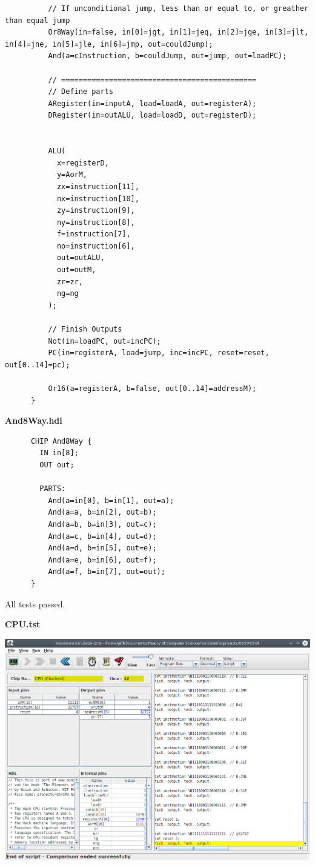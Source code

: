 \documentclass[titlepage]{article}
\begin{document}
\begin{description}
{\begin{lstlisting}
          // If unconditional jump, less than or equal to, or greather than equal jump
          Or8Way(in=false, in[0]=jgt, in[1]=jeq, in[2]=jge, in[3]=jlt, in[4]=jne, in[5]=jle, in[6]=jmp, out=couldJump);
          And(a=cInstruction, b=couldJump, out=jump, out=loadPC);

          // =============================================
          // Define parts
          ARegister(in=inputA, load=loadA, out=registerA);
          DRegister(in=outALU, load=loadD, out=registerD);


          ALU(
            x=registerD,
            y=AorM,
            zx=instruction[11],
            nx=instruction[10],
            zy=instruction[9],
            ny=instruction[8],
            f=instruction[7],
            no=instruction[6],
            out=outALU,
            out=outM,
            zr=zr,
            ng=ng
          );

          // Finish Outputs
          Not(in=loadPC, out=incPC);
          PC(in=registerA, load=jump, inc=incPC, reset=reset, out[0..14]=pc);

          Or16(a=registerA, b=false, out[0..14]=addressM);
      }
    \end{lstlisting}

    \textbf{And8Way.hdl}

    \begin{lstlisting}
      CHIP And8Way {
        IN in[8];
        OUT out;

        PARTS:
          And(a=in[0], b=in[1], out=a);
          And(a=a, b=in[2], out=b);
          And(a=b, b=in[3], out=c);
          And(a=c, b=in[4], out=d);
          And(a=d, b=in[5], out=e);
          And(a=e, b=in[6], out=f);
          And(a=f, b=in[7], out=out);
      }
    \end{lstlisting}

    All tests passed.

    \textbf{CPU.tst}

    \includegraphics[width=.9\textwidth]{cpu.png}

}
\end{description}
\end{document}
